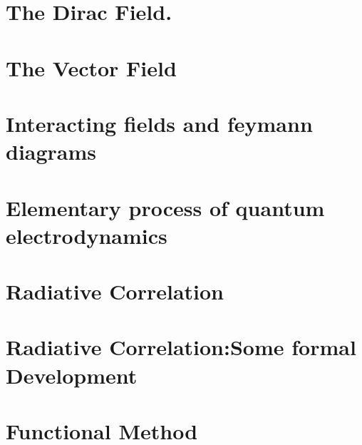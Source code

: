 \section{The Dirac Field.}


\section{The Vector Field}


\section{Interacting fields and feymann diagrams}


\section{Elementary process of quantum electrodynamics}


\section{Radiative Correlation}


\section{Radiative Correlation:Some formal Development}


\section{Functional Method}


\clearpage

